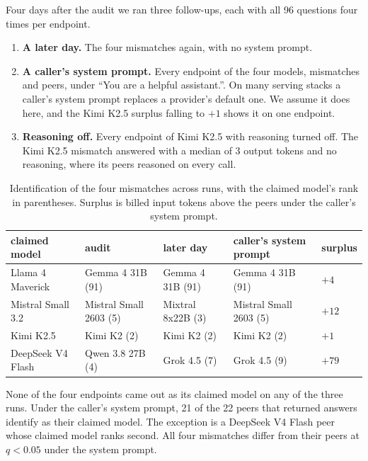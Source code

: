 \documentclass[11pt]{article}
\begin{document}
Four days after the audit we ran three follow-ups, each with all 96 questions four times per
endpoint.
\begin{enumerate}\setlength{\itemsep}{0pt}
\item \textbf{A later day.} The four mismatches again, with no system prompt.
\item \textbf{A caller's system prompt.} Every endpoint of the four models, mismatches and peers,
under ``You are a helpful assistant.''. On many serving stacks a caller's system prompt replaces a
provider's default one. We assume it does here, and the Kimi K2.5 surplus falling to $+1$ shows it
on one endpoint.
\item \textbf{Reasoning off.} Every endpoint of Kimi K2.5 with reasoning turned off. The Kimi K2.5
mismatch answered with a median of 3 output tokens and no reasoning, where its peers reasoned on
every call.
\end{enumerate}

\begin{table}[h]
\centering\small
\begin{tabular}{lllll}
\toprule
claimed model & audit & later day & caller's system prompt & surplus \\
\midrule
Llama 4 Maverick & Gemma 4 31B (91) & Gemma 4 31B (91) & Gemma 4 31B (91) & $+4$ \\
Mistral Small 3.2 & Mistral Small 2603 (5) & Mixtral 8x22B (3) & Mistral Small 2603 (5) & $+12$ \\
Kimi K2.5 & Kimi K2 (2) & Kimi K2 (2) & Kimi K2 (2) & $+1$ \\
DeepSeek V4 Flash & Qwen 3.8 27B (4) & Grok 4.5 (7) & Grok 4.5 (9) & $+79$ \\
\bottomrule
\end{tabular}
\caption{Identification of the four mismatches across runs, with the claimed model's rank in
parentheses. Surplus is billed input tokens above the peers under the caller's system prompt.}
\label{tab:followup}
\end{table}

None of the four endpoints came out as its claimed model on any of the three runs. Under the
caller's system prompt, 21 of the 22 peers that returned answers identify as their claimed model.
The exception is a DeepSeek V4 Flash peer whose claimed model ranks second. All four mismatches
differ from their peers at $q < 0.05$ under the system prompt.
\end{document}
